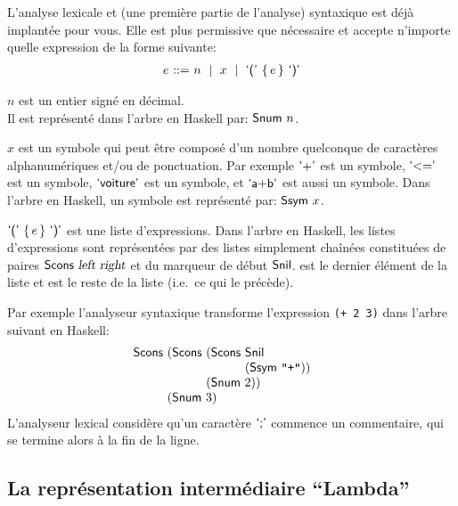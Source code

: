 \documentclass{article}
\begin{document}
L'analyse lexicale et (une première partie de l'analyse) syntaxique est déjà
implantée pour vous.  Elle est plus permissive %
que nécessaire et accepte n'importe quelle expression de la
forme suivante:
\begin{displaymath}
  \begin{array}{r@{~}r@{~}l}
    e & ::= & n ~\mid~ x 
    ~\mid~ \punc{(}~\{\,e\,\}%
     ~\punc{)}
  \end{array}
\end{displaymath}
\begin{outitemize}
\item $n$ est un entier signé en décimal.  \\
  Il est représenté dans l'arbre en Haskell par: $\textsf{Snum}~n$.
\item $x$ est un symbole qui peut être composé d'un nombre quelconque de
  caractères alphanumériques et/ou de ponctuation.  Par exemple $\textsf{`+'}$ est
  un symbole, $\textsf{`<='}$ est un symbole, $\textsf{`voiture'}$ est un symbole,
  et $\textsf{`a+b'}$ est aussi un symbole.  Dans l'arbre en Haskell, un symbole
  est représenté par: $\textsf{Ssym}~x$.
\item $\punc{(}~\{\,e\,\}%
  ~\punc{)}$ est une liste d'expressions.  Dans l'arbre en Haskell, les
  listes d'expressions sont représentées par des listes simplement chaînées
  constituées de paires $\textsf{Scons}~\textsl{left}~\textsl{right}$ et du marqueur de
  début $\textsf{Snil}$.   est le dernier élément de la liste et
   est le reste de la liste (i.e.~ce qui le précède).
\end{outitemize}
Par exemple l'analyseur syntaxique transforme l'expression \texttt{(+ 2 3)}
dans l'arbre suivant en Haskell:
\begin{displaymath}
  \kw{Scons}~\MAlign{
    (\kw{Scons}~\MAlign{
      (\kw{Scons}~\MAlign{
        {\kw{Snil}} \\
        (\kw{Ssym}~\str{+}))} \\
      (\kw{Snum}~2))} \\
    (\kw{Snum}~3)}
\end{displaymath}
L'analyseur lexical considère qu'un caractère $\textsf{`;'}$ commence un
commentaire, qui se termine alors à la fin de la ligne.

\subsection{La représentation intermédiaire ``Lambda''}
\end{document}
